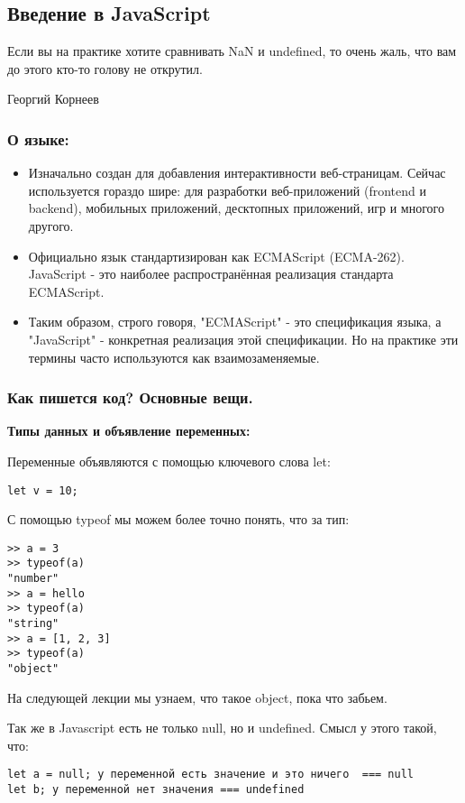 \subsection{Введение в JavaScript}
\epigraph{Если вы на практике хотите сравнивать NaN и undefined, то очень жаль, что вам до этого кто-то голову не открутил.}{Георгий Корнеев}
\subsubsection{О языке:}
\begin{itemize}
    \item Изначально создан для добавления интерактивности веб-страницам. Сейчас используется гораздо шире: для разработки веб-приложений (frontend и backend), мобильных приложений, десктопных приложений, игр и многого другого.
    \item Официально язык стандартизирован как ECMAScript (ECMA-262). JavaScript - это наиболее распространённая реализация стандарта ECMAScript.
    \item Таким образом, строго говоря, "ECMAScript" - это спецификация языка, а "JavaScript" - конкретная реализация этой спецификации. Но на практике эти термины часто используются как взаимозаменяемые.
\end{itemize}

\subsubsection{Как пишется код? Основные вещи.}

\textbf{Типы данных и объявление переменных:}

Переменные объявляются с помощью ключевого слова let:\begin{verbatim}
let v = 10;
\end{verbatim}
С помощью typeof мы можем более точно понять, что за тип:
\begin{verbatim}
>> a = 3
>> typeof(a)
"number"
>> a = hello
>> typeof(a)
"string"
>> a = [1, 2, 3]
>> typeof(a)
"object"
\end{verbatim}
На следующей лекции мы узнаем, что такое object, пока что забьем.

Так же в Javascript есть не только null, но и undefined. Смысл у этого такой, что:
\begin{verbatim}
let a = null; у переменной есть значение и это ничего  === null
let b; у переменной нет значения === undefined 
\end{verbatim}

